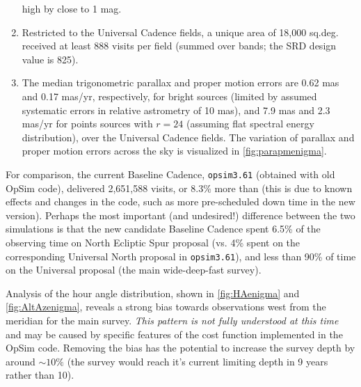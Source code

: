 \begin{enumerate}
high by close to 1 mag.
\item Restricted to the Universal Cadence fields, a unique area of
18,000 sq.deg. received at least 888 visits per field (summed over bands;
the SRD design value is 825).
\item The median trigonometric parallax and proper motion errors are
0.62 mas and 0.17 mas/yr, respectively, for bright sources (limited by
assumed systematic errors in relative astrometry of 10 mas), and 7.9
mas and 2.3 mas/yr for points sources with $r=24$ (assuming flat
spectral energy distribution), over the Universal Cadence fields. The
variation of parallax and proper motion errors across the sky is
visualized in \autoref{fig:parapmenigma}.
\end{enumerate}





For comparison, the current Baseline Cadence, \texttt{opsim3.61}
(obtained with old OpSim code), delivered 2,651,588 visits, or 8.3\%
more than   (this is due to known effects and
changes in the code,  such as more pre-scheduled down time in the new
version). Perhaps the most important (and undesired!) difference
between the two simulations is that the new candidate Baseline Cadence
spent 6.5\% of the observing time on North Ecliptic Spur proposal (vs.
4\% spent on the corresponding Universal North proposal in
\texttt{opsim3.61}), and less than 90\% of time on the Universal
proposal (the main wide-deep-fast survey).

Analysis of the hour angle distribution, shown in
\autoref{fig:HAenigma} and \autoref{fig:AltAzenigma}, reveals a strong
bias towards observations west from the meridian for the main survey.
{\it This pattern is not fully understood at this time} and may be
caused by specific features of the cost function implemented in the
OpSim code. Removing the bias has the potential to increase the survey depth by around $\sim10\%$ (the survey would reach it's current limiting depth in 9 years rather than 10).



